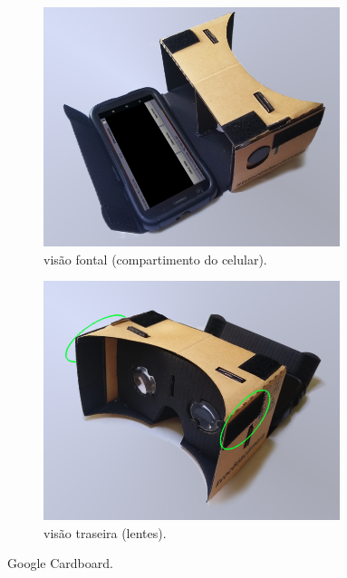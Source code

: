 \begin{figure}[H]
	\centering
	\begin{subfigure}{.5\textwidth}
		\includegraphics[width=0.95\textwidth]{figuras/cardboard1.png}
		\caption{visão fontal (compartimento do celular).}
	\end{subfigure}%
	\begin{subfigure}{.5\textwidth}
		\includegraphics[width=0.95\textwidth]{figuras/cardboard2.png}
		\caption{visão traseira (lentes).}
		\label{fig:googlecardboard_welcro}
	\end{subfigure}
	\caption{Google Cardboard.}
	\label{fig:googlecardboard}
\end{figure}

